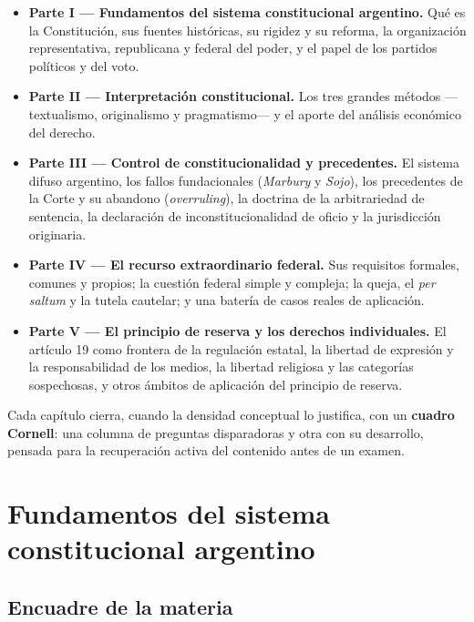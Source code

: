 \documentclass[12pt,oneside]{book}
\begin{document}
\begin{itemize}
    \item \textbf{Parte I --- Fundamentos del sistema constitucional argentino.} Qué es la Constitución, sus fuentes históricas, su rigidez y su reforma, la organización representativa, republicana y federal del poder, y el papel de los partidos políticos y del voto.
    \item \textbf{Parte II --- Interpretación constitucional.} Los tres grandes métodos ---textualismo, originalismo y pragmatismo--- y el aporte del análisis económico del derecho.
    \item \textbf{Parte III --- Control de constitucionalidad y precedentes.} El sistema difuso argentino, los fallos fundacionales (\emph{Marbury} y \emph{Sojo}), los precedentes de la Corte y su abandono (\emph{overruling}), la doctrina de la arbitrariedad de sentencia, la declaración de inconstitucionalidad de oficio y la jurisdicción originaria.
    \item \textbf{Parte IV --- El recurso extraordinario federal.} Sus requisitos formales, comunes y propios; la cuestión federal simple y compleja; la queja, el \emph{per saltum} y la tutela cautelar; y una batería de casos reales de aplicación.
    \item \textbf{Parte V --- El principio de reserva y los derechos individuales.} El artículo 19 como frontera de la regulación estatal, la libertad de expresión y la responsabilidad de los medios, la libertad religiosa y las categorías sospechosas, y otros ámbitos de aplicación del principio de reserva.
\end{itemize}

Cada capítulo cierra, cuando la densidad conceptual lo justifica, con un \textbf{cuadro Cornell}: una columna de preguntas disparadoras y otra con su desarrollo, pensada para la recuperación activa del contenido antes de un examen.


\mainmatter

\part{Fundamentos del sistema constitucional argentino}

\chapter{Encuadre de la materia}
\end{document}

